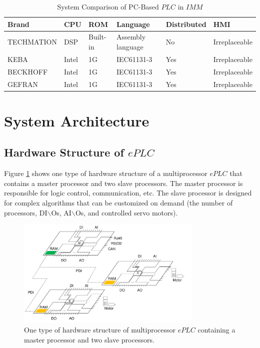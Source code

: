 \documentclass[journal,UTF8]{IEEEtran}
\begin{document}
	\begin{table}
		\scriptsize \caption{System Comparison of PC-Based $PLC$ in $IMM$}
		\label{table:IMMControllor}
		\begin{center}
			\renewcommand{\arraystretch}{1.4}
			\setlength\tabcolsep{3pt}
			\begin{tabular}{|p{1.6cm}|p{0.5cm}|p{0.8cm}|p{2cm}|p{1.1cm}|p{1.3cm}|}
				\hline
				Brand       & CPU    & ROM & Language       & Distributed  & HMI\\
				\hline
				TECHMATION  & DSP    & Built-in  & Assembly language        &No  & Irreplaceable \\
				\hline
				KEBA        & Intel  & 1G  & IEC61131-3                 &Yes    & Irreplaceable\\
				\hline
				BECKHOFF    & Intel  & 1G  & IEC61131-3               &Yes   &Irreplaceable\\
				\hline
				GEFRAN      & Intel  & 1G  &IEC61131-3                 &Yes   &Irreplaceable\\
				\hline
			\end{tabular}
		\end{center}
	\end{table}
	\section{System Architecture}
	\label{MultiProcessorePLC}
	\subsection{Hardware Structure of $ePLC$}
	Figure \ref{fig:HardwareStructure} shows one type of hardware structure of a multiprocessor $ePLC$ that contains a master processor and two slave processors. The master processor is responsible for logic control, communication, etc. The slave processor is designed for complex algorithms that can be customized on demand (the number of processors, DI$\backslash$Os, AI$\backslash$Os, and controlled servo motors).
	\begin{figure}
		\centering
		\includegraphics[width=3.5in]{fig/FIG2.pdf}
		\caption{ One type of hardware structure of multiprocessor $ePLC$ containing a master processor and two slave processors.}
		\label{fig:HardwareStructure}
	\end{figure}
\end{document}
